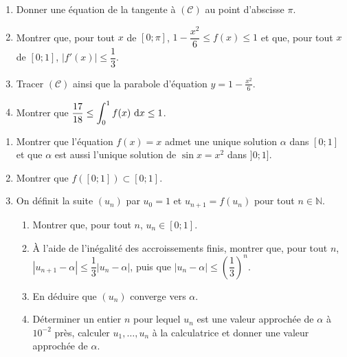 \begin{exo}
\begin{description}
\begin{enumerate}
                        \item Donner une \'equation de la tangente \`a $(\mathscr{C})$ au point d'abscisse $\pi$.
                        \item Montrer que, pour tout $x$ de $[0 ; \pi]$, $1 - \dfrac{x^2}{6} \leq f(x) \leq 1$ et
                              que, pour tout $x$ de $[0 ; 1]$, $\left| f'(x) \right| \leq \dfrac{1}{3}$.
                        \item Tracer $(\mathscr{C})$ ainsi que la parabole d'\'equation $y = 1 - \frac{x^2}{6}$.
                        \item Montrer que $\dfrac{17}{18} \leq \displaystyle \int_0^1 f(x) ~\mathrm{d}x \leq 1$.
                  \end{enumerate}
            \item[Partie C : une suite r\'ecurrente.]
                  \begin{enumerate}
                        \item Montrer que l'\'equation $f(x) = x$ admet une unique solution $\alpha$ dans $[0 ; 1]$
                              et que $\alpha$ est aussi l'unique solution de $\sin x = x^2$ dans $]0 ; 1]$.
                        \item Montrer que $f\left( [0 ; 1] \right) \subset [0 ; 1]$.
                        \item On d\'efinit la suite $(u_n)$ par $u_0 = 1$ et $u_{n+1} = f(u_n)$ pour tout $n \in \mathbb{N}$.
                              \begin{enumerate}
                                    \item Montrer que, pour tout $n$, $u_n \in [0 ; 1]$.
                                    \item \`A l'aide de l'in\'egalit\'e des accroissements finis, montrer que, pour tout $n$,
                                          $\left| u_{n+1} - \alpha \right| \leq \dfrac{1}{3} \left| u_n - \alpha \right|$,
                                          puis que $\left| u_n - \alpha \right| \leq \left( \dfrac{1}{3} \right)^n$.
                                    \item En d\'eduire que $(u_n)$ converge vers $\alpha$.
                                    \item D\'eterminer un entier $n$ pour lequel $u_n$ est une valeur approch\'ee de $\alpha$ \`a $10^{-2}$ pr\`es,
                                          calculer $u_1, \ldots, u_n$ \`a la calculatrice et donner une valeur approch\'ee de $\alpha$.
                              \end{enumerate}
                  \end{enumerate}
      \end{description}
\end{exo}
